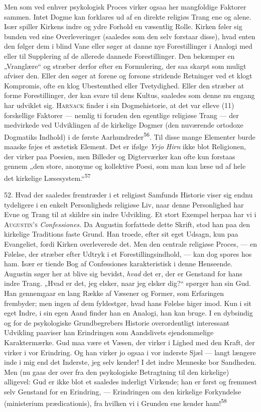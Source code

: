 \documentclass[12pt,a4paper,openany]{book}
\newcommand{\opage}[1]{\marginnote{\footnotesize\textit{[#1]}}}
\begin{document}
Men som ved enhver psykologisk Proces virker ogsaa her mangfoldige
Faktorer sammen. Intet Dogme kan forklares ud af en direkte religiøs
Trang ene og alene. Især spiller Kirkens indre og ydre Forhold en
væsentlig Rolle. Kirken føler sig bunden ved sine Overleveringer
(saaledes som den selv forstaar disse), hvad enten den følger dem i
blind Vane eller søger at danne nye Forestillinger i Analogi med eller
til Supplering af de allerede dannede Forestillinger. Den bekæmper en
„Vranglære“ og stræber derfor efter en Formulering, der saa skarpt som
muligt afviser den. Eller den søger at forene og forsone stridende
Retninger ved et klogt Kompromis, ofte en klog Ubestemthed eller
Tvetydighed. Eller den stræber at forme Forestillinger, der kan svare
til dens Kultus, saaledes som denne nu engang har udviklet sig.
\textsc{Harnack} finder i sin Dogmehistorie, at det var elleve (11)
forskellige Faktorer --- nemlig ti foruden den egentlige religiøse Trang
--- der medvirkede ved Udviklingen af de kirkelige Dogmer (den nuværende
ortodoxe Dogmatiks Indhold) i de første
Aarhundreder\textsuperscript{56}. Til disse mange Elementer burde maaske
føjes et æstetisk Element. Det er ifølge \textit{Yrjo Hirn} ikke blot
Religionen, der virker paa Poesien, men Billeder og Digterværker kan
ofte kun forstaas gennem „den store, anonyme og kollektive Poesi, som
man kan læse ud af hele det kirkelige Læsesystem.“\textsuperscript{57}

52. Hvad der saaledes fremtræder i et religiøst Samfunds Historie viser
sig endnu tydeligere i en enkelt Personligheds religiøse Liv, naar denne
Personlighed har Evne og Trang til at skildre sin indre Udvikling. Et
stort Exempel herpaa har vi i \textsc{Augustin’s} \textit{Confessiones.}
Da Augustin forfattede dette Skrift, stod han paa den kirkelige
Traditions faste Grund. Han troede, efter sit eget Udsagn, kun paa
Evangeliet, fordi Kirken overleverede det. Men den centrale religiøse
Proces, --- en Følelse, der stræber efter Udtryk i et
Forestillingsindhold, --- kan dog spores hos ham. Især er tiende Bog af
Confessiones karakteristisk i denne Henseende. Augustin søger her at
blive sig bevidst, \textit{hvad} det er, der er Genstand for hans indre
Trang. „Hvad er det, jeg elsker, naar jeg elsker dig?“ spørger han sin
Gud. Han gennemgaar en lang Række af Væsener og Former, som Erfaringen
frembyder; men ingen af dem fyldestgør, hvad hans Følelse higer imod.
Kun i sit eget Indre, i sin egen Aand finder han en Analogi, han kan
\opage{116}bruge. I en dybsindig og for de psykologiske Grundbegrebers
Historie overordentligt interessant Udvikling paaviser han Erindringen
som Aandslivets ejendommelige Karaktermærke. Gud maa være et Væsen, der
virker i Lighed med den Kraft, der virker i vor Erindring. Og han virker
jo ogsaa i vor inderste Sjæl --- langt længere inde i mig end det
Inderste, jeg selv kender! I det indre Menneske bor Sandheden. Men (nu
gaas der over fra den psykologiske Betragtning til den kirkelige)
alligevel: Gud er ikke blot et saaledes inderligt Virkende; han er først
og fremmest selv Genstand for en Erindring, --- Erindringen om den
kirkelige Forkyndelse (ministerium prædicationis), fra hvilken vi i
Grunden ene kender ham!\textsuperscript{58}
\end{document}
